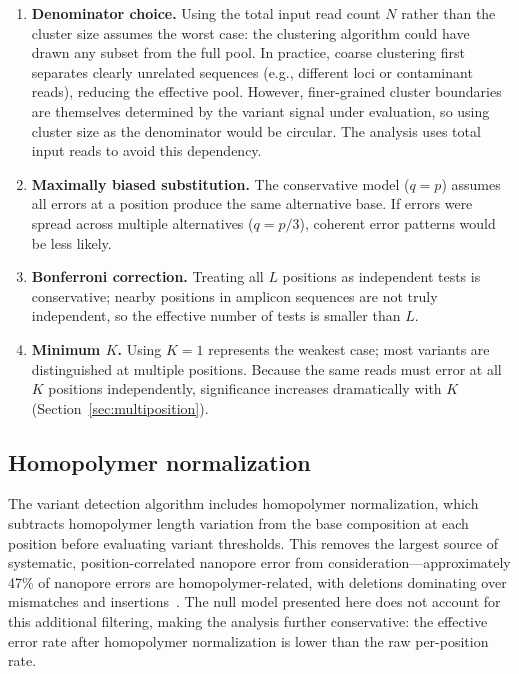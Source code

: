 \documentclass[11pt]{article}
\begin{document}
\begin{enumerate}
\item \textbf{Denominator choice.} Using the total input read count $N$ rather
than the cluster size assumes the worst case: the clustering algorithm could have
drawn any subset from the full pool. In practice, coarse clustering first
separates clearly unrelated sequences (e.g., different loci or contaminant
reads), reducing the effective pool. However, finer-grained cluster boundaries
are themselves determined by the variant signal under evaluation, so using
cluster size as the denominator would be circular. The analysis uses total input
reads to avoid this dependency.

\item \textbf{Maximally biased substitution.} The conservative model ($q = p$)
assumes all errors at a position produce the same alternative base. If errors
were spread across multiple alternatives ($q = p/3$), coherent error patterns
would be less likely.

\item \textbf{Bonferroni correction.} Treating all $L$ positions as independent
tests is conservative; nearby positions in amplicon sequences are not truly
independent, so the effective number of tests is smaller than $L$.

\item \textbf{Minimum $K$.} Using $K = 1$ represents the weakest case; most
variants are distinguished at multiple positions. Because the same reads must
error at all $K$ positions independently, significance increases dramatically
with $K$ (Section~\ref{sec:multiposition}).
\end{enumerate}

\subsection{Homopolymer normalization}

The variant detection algorithm includes homopolymer normalization, which
subtracts homopolymer length variation from the base composition at each position
before evaluating variant thresholds. This removes the largest source of
systematic, position-correlated nanopore error from consideration---approximately
47\% of nanopore errors are homopolymer-related, with deletions dominating over
mismatches and insertions~\cite{delahaye2021}. The null model
presented here does not account for this additional filtering, making the analysis
further conservative: the effective error rate after homopolymer normalization is
lower than the raw per-position rate.
\end{document}

